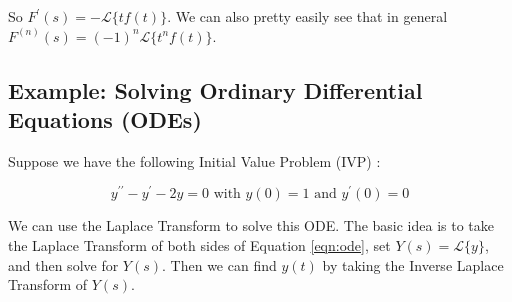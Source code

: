 \documentclass{article}
\theoremstyle{definition}
\begin{document}
\bigskip
\noindent
So $F^\prime(s) = -\mathcal{L}\{tf(t)\}$. We can also pretty easily see that in general $F^{(n)}(s) = (-1)^n \mathcal{L}\{t^n f(t)\}$.

\bigskip
\subsection{Example: Solving Ordinary Differential Equations (ODEs)}
\label{sec:example_ode}
\bigskip
\noindent
Suppose we have the following Initial Value Problem (IVP)  \cite{wiki:initial_value_problem}:

\smallskip
\begin{equation}
y^{\prime \prime} - y^\prime -2y = 0 \text{ with $y(0) = 1$ and $y^\prime (0) = 0$}
\label{eqn:ode}
\end{equation}

\bigskip
\noindent
We can use the Laplace Transform to solve this ODE. The basic
idea is to take the Laplace Transform of both sides of Equation
\ref{eqn:ode}, set $Y(s) = \mathcal{L}\{y\}$, and then solve for
$Y(s)$. Then we can find $y(t)$ by taking the Inverse Laplace
Transform of $Y(s)$.
\end{document}
